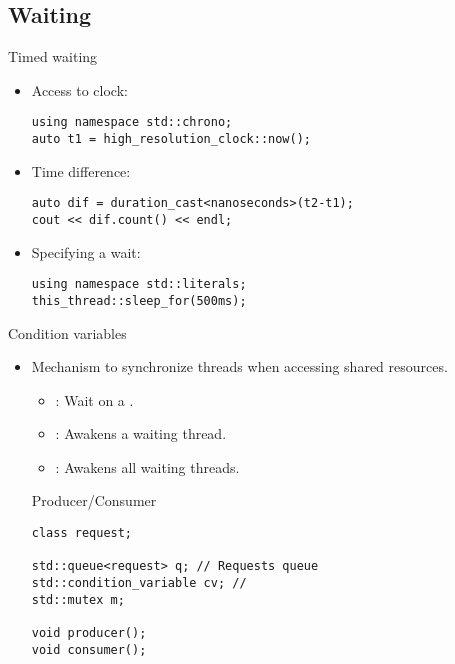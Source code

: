 \subsection{Waiting}

\begin{frame}[t,fragile]{Timed waiting}
\begin{itemize}
  \item Access to clock:
\begin{lstlisting}
using namespace std::chrono;
auto t1 = high_resolution_clock::now();
\end{lstlisting}
  \item Time difference:
\begin{lstlisting}
auto dif = duration_cast<nanoseconds>(t2-t1);
cout << dif.count() << endl;
\end{lstlisting}
  \item Specifying a wait:
\begin{lstlisting}
using namespace std::literals;
this_thread::sleep_for(500ms);
\end{lstlisting}
\end{itemize}
\end{frame}

\begin{frame}[t,fragile]{Condition variables}
\begin{itemize}
  \item Mechanism to synchronize threads when accessing shared resources.
    \begin{itemize}
      \item {}: Wait on a .
      \item {}: Awakens a waiting thread.
      \item {}: Awakens all waiting threads.
    \end{itemize}
\begin{block}{Producer/Consumer}
\begin{lstlisting}
class request;

std::queue<request> q; // Requests queue
std::condition_variable cv; //
std::mutex m;

void producer();
void consumer();
\end{lstlisting}
\end{block}
\end{itemize}
\end{frame}

